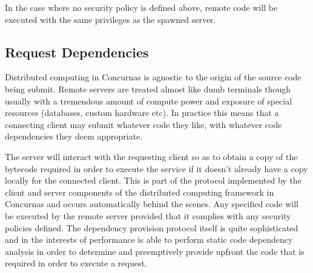 \documentclass[conc-doc]{subfiles}
\begin{document}
In the case where no security policy is defined above, remote code will be executed with the same privileges as the spawned server.

\subsection{Request Dependencies}
Distributed computing in Concurnas is agnostic to the origin of the source code being submit. Remote servers are treated almost like dumb terminals though usually with a tremendous amount of compute power and exposure of special resources (databases, custom hardware etc). In practice this means that a connecting client may submit whatever code they like, with whatever code dependencies they deem appropriate.

The server will interact with the requesting client so as to obtain a copy of the bytecode required in order to execute the service if it doesn't already have a copy locally for the connected client. This is part of the protocol implemented by the client and server components of the distributed computing framework in Concurnas and occurs automatically behind the scenes. Any specified code will be executed by the remote server provided that it complies with any security policies defined. The dependency provision protocol itself is quite sophisticated and in the interests of performance is able to perform static code dependency analysis in order to determine and preemptively provide upfront the code that is required in order to execute a request.





\end{document}
